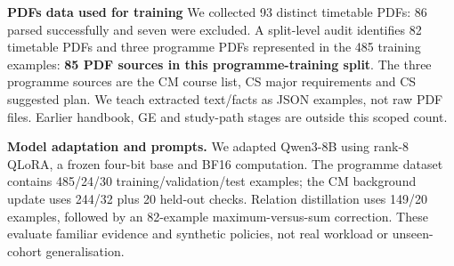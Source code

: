 \documentclass{article}
\begin{document}
\textbf{PDFs data used for training} We collected 93 distinct timetable PDFs: 86 parsed successfully and seven were excluded. A split-level audit identifies 82 timetable PDFs and three programme PDFs represented in the 485 training examples: \textbf{85 PDF sources in this programme-training split}. The three programme sources are the CM course list, CS major requirements and CS suggested plan. We teach extracted text/facts as JSON examples, not raw PDF files. Earlier handbook, GE and study-path stages are outside this scoped count.

\textbf{Model adaptation and prompts.} We adapted Qwen3-8B using rank-8 QLoRA, a frozen four-bit base and BF16 computation\citep{qwen,qlora}. The programme dataset contains 485/24/30 training/validation/test examples; the CM background update uses 244/32 plus 20 held-out checks. Relation distillation uses 149/20 examples, followed by an 82-example maximum-versus-sum correction. These evaluate familiar evidence and synthetic policies, not real workload or unseen-cohort generalisation.
\end{document}
